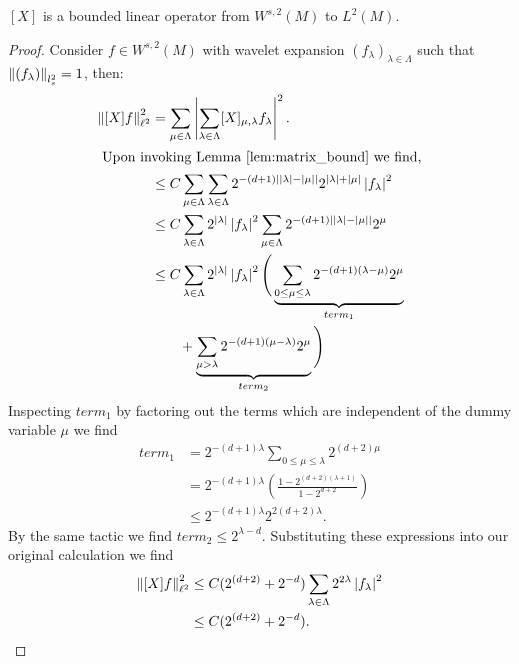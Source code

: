 \begin{lemma} \label{lem:M_bound}
	$[X]$ is a bounded linear operator from $W^{s,2}(M)$ to $L^2(M)$.
\end{lemma}
\begin{proof}
	Consider $f \in W^{s,2}(M)$ with wavelet expansion $(f_\lambda)_{\lambda \in \Lambda}$ such that $\left\| (f_\lambda) \right\|_{l_s^2} = 1$, then:
	\begin{align*}
		\left\| [X] f \right\|_{\ell^2}^2   &=    \sum_{\mu \in \Lambda} \left|  \sum_{\lambda \in \Lambda} [X]_{\mu,\lambda} f_{\lambda}  \right|^2. \\
		\intertext{ Upon invoking Lemma \ref{lem:matrix_bound} we find,}
							&\leq C\sum_{\mu \in \Lambda} \sum_{\lambda \in \Lambda} 2^{-(d+1)\left| {\lvert\lambda\rvert} - {\lvert\mu\rvert} \right|} 2^{{\lvert\lambda\rvert}+{\lvert\mu\rvert}} \left| f_\lambda \right|^2 \\
							&\leq C\sum_{\lambda \in \Lambda} 2^{{\lvert\lambda\rvert}} \left| f_\lambda \right|^2 \sum_{\mu \in \Lambda} 2^{-(d+1)\left| {\lvert\lambda\rvert}-{\lvert\mu\rvert} \right|}2^\mu \\
							&\leq C\sum_{\lambda \in \Lambda}  2^{{\lvert\lambda\rvert}} \left| f_\lambda \right|^2 \Bigg( \underbrace{\sum_{0\leq\mu\leq\lambda} 2^{-(d+1)(\lambda - \mu)}2^{\mu}}_{term_1} \\
							&\qquad  + \underbrace{\sum_{\mu > \lambda} 2^{-(d+1)(\mu-\lambda)}2^{\mu} }_{term_2} \Bigg) \label{eq:terms}
		\end{align*}
		Inspecting $term_1$ by factoring out the terms which are independent of the dummy variable $\mu$ we find
		\begin{align*}
			term_1 &= 2^{-(d+1) \lambda }\sum_{0\leq\mu\leq\lambda} 2^{(d+2) \mu} \\
			&= 2^{-(d+1) \lambda} \left(  \frac{ 1-2^{(d+2)(\lambda + 1)} }{1 - 2^{d+2} } \right) \\
			&\leq 2^{-(d+1) \lambda} 2^{2(d+2)\lambda}.
		\end{align*}
		By the same tactic we find $term_2 \leq 2^{\lambda - d}$.  Substituting these expressions into our original calculation we find
		\begin{align*}	
			\left\| [X]f \right\|_{\ell^2}^2 	&\leq C(2^{(d+2)}+2^{-d}) \sum_{\lambda \in \Lambda} 2^{2\lambda} \left| f_{\lambda} \right|^2 \\
							&\leq C(2^{(d+2)}+2^{-d}).
		\end{align*}
\end{proof}

